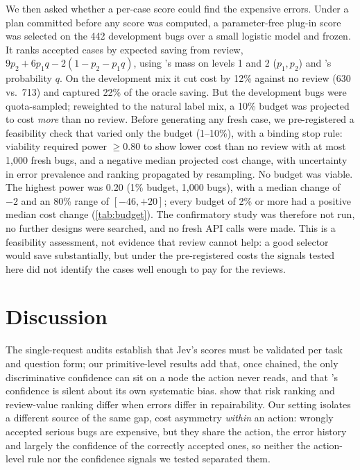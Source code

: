 \begin{table}[t]
\centering
\small
\setlength{\tabcolsep}{4pt}
\resizebox{\linewidth}{!}{}
\caption{Pre-registered feasibility check for the case-level score:
simulated power to show lower cost than no review (one-sided
$\alpha = 0.05$), and the median and 80\% range of the projected cost
change, over 400 simulated studies per cell under the natural label mix.
Viability required power $\geq 0.80$; no cell met it.}
\label{tab:budget}
\end{table}

 We then asked whether a
per-case score could find the expensive errors. Under a plan committed
before any score was computed, a parameter-free plug-in score was selected
on the 442 development bugs over a small logistic model and frozen. It
ranks accepted cases by expected saving from review,
$9p_2 + 6p_1q - 2(1 - p_2 - p_1q)$, using \score{}'s mass on levels 1 and 2
($p_1, p_2$) and \noul{}'s probability $q$. On the development mix it cut
cost by 12\% against no review (630 vs.\ 713) and captured 22\% of the
oracle saving. But the development bugs were quota-sampled; reweighted to
the natural label mix, a 10\% budget was projected to cost \emph{more}
than no review. Before generating any fresh case, we pre-registered a
feasibility check that varied only the budget (1--10\%), with a binding
stop rule: viability required power $\geq 0.80$ to show lower cost than no
review with at most 1{,}000 fresh bugs, and a negative median projected
cost change, with uncertainty in error prevalence and ranking propagated
by resampling. No budget was viable. The highest power was 0.20 (1\%
budget, 1{,}000 bugs), with a median change of $-2$ and an 80\% range of
$[-46, +20]$; every budget of 2\% or more had a positive median cost change
(\cref{tab:budget}). The confirmatory study was therefore not run, no
further designs were searched, and no fresh API calls were made. This is a
feasibility assessment, not evidence that review cannot help: a good
selector would save substantially, but under the pre-registered costs the
signals tested here did not identify the cases well enough to pay for the
reviews.

\section{Discussion}

 The single-request audits
\citep{deusser2026jev,meng2026jevaudit} establish that Jev's scores must
be validated per task and question form; our primitive-level results add
that, once chained, the only discriminative confidence can sit on a node
the action never reads, and that \score{}'s confidence is silent about its
own systematic bias. \citet{park2026riskreview} show that risk ranking
and review-value ranking differ when errors differ in repairability. Our
setting isolates a different source of the same gap, cost asymmetry
\emph{within} an action: wrongly accepted serious bugs are expensive, but
they share the action, the error history and largely the confidence of
the correctly accepted ones, so neither the action-level rule nor the
confidence signals we tested separated them.


